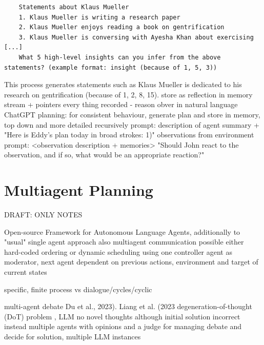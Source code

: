 \documentclass{article}
\begin{document}
\begin{verbatim}
	Statements about Klaus Mueller 
	1. Klaus Mueller is writing a research paper 
	2. Klaus Mueller enjoys reading a book on gentrification 
	3. Klaus Mueller is conversing with Ayesha Khan about exercising [...] 
	What 5 high-level insights can you infer from the above statements? (example format: insight (because of 1, 5, 3)) 
\end{verbatim}
This process generates statements such as Klaus Mueller is dedicated to his research on gentrification (because of 1, 2, 8, 15).
store as reflection in memory stream + pointers
every thing recorded - reason obver in natural language
ChatGPT
planning: for consistent behaviour, generate plan and store in memory, top down and more detailed recursively
prompt:
description of agent summary + "Here is Eddy’s plan today in broad strokes: 1)" 
observations from environment
prompt:
<observation description + memories> "Should John react to the observation, and if so, what would be an appropriate reaction?"



\FloatBarrier
\section{Multiagent Planning}
DRAFT: ONLY NOTES

\cite{zhou_agents_2023} Open-source Framework for Autonomous Language Agents, additionally to "usual" single agent approach also multiagent communication
\cite{zhou_agents_2023} possible either hard-coded ordering or dynamic scheduling using one controller agent as moderator, next agent dependent on previous actions, environment and target of current states

specific, finite process
vs dialogue/cycles/cyclic

multi-agent debate Du et al., 2023). Liang et al. (2023
degeneration-of-thought (DoT) problem , LLM no novel thoughts although initial solution incorrect
instead multiple agents with opinions and a judge for managing debate and decide for solution, multiple LLM instances
\end{document}
